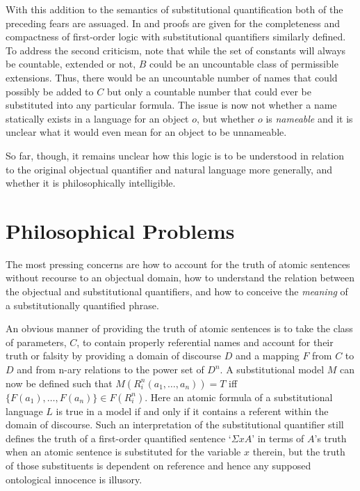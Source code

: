 \documentclass[12pt,a4paper]{article}
\begin{document}
With this addition to the semantics of substitutional quantification
both of the preceding fears are assuaged.  In \cite{bonevac84} and
\cite{dunn} proofs are given for the completeness and compactness of
first-order logic with substitutional quantifiers similarly defined.
To address the second criticism, note that while the set of constants
will always be countable, extended or not, $B$ could be an uncountable
class of permissible extensions.  Thus, there would be an uncountable
number of names that could possibly be added to $C$ but only a
countable number that could ever be substituted into any particular
formula.  The issue is now not whether a name statically exists in a
language for an object $o$, but whether $o$ is \emph{nameable} and it
is unclear what it would even mean for an object to be unnameable.

So far, though, it remains unclear how this logic is to be understood
in relation to the original objectual quantifier and natural language
more generally, and whether it is philosophically intelligible.


\section{Philosophical Problems}

The most pressing concerns are how to account for the truth of atomic
sentences without recourse to an objectual domain, how to understand
the relation between the objectual and substitutional quantifiers, and
how to conceive the \emph{meaning} of a substitutionally quantified
phrase.

An obvious manner of providing the truth of atomic sentences is to
take the class of parameters, $C$, to contain properly referential
names and account for their truth or falsity by providing a domain of
discourse $D$ and a mapping $F$ from $C$ to $D$ and from n-ary
relations to the power set of $D^n$. A substitutional model $M$ can
now be defined such that $M(R^n_i(a_1, \ldots, a_n)) = T$ iff $\{F(a_1),
\ldots, F(a_n)\} \in F(R^n_i)$.  Here an atomic formula of a
substitutional language $L$ is true in a model if and only if it
contains a referent within the domain of discourse.  Such an
interpretation of the substitutional quantifier still defines the
truth of a first-order quantified sentence `$\Sigma xA$' in terms of
$A$'s truth when an atomic sentence is substituted for the variable
$x$ therein, but the truth of those substituents is dependent on
reference and hence any supposed ontological innocence is illusory.
\end{document}
